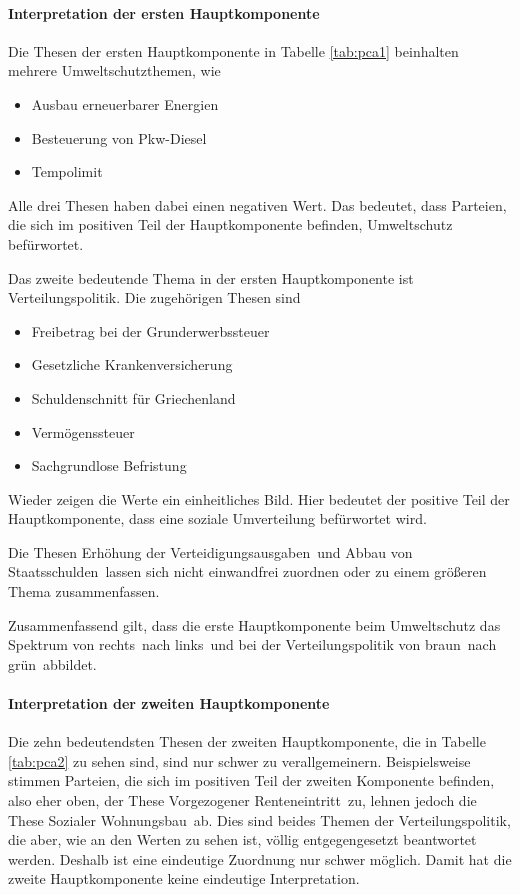 \paragraph{Interpretation der ersten Hauptkomponente}
Die Thesen der ersten Hauptkomponente in Tabelle \ref{tab:pca1} beinhalten mehrere Umweltschutzthemen, wie
\begin{itemize}
	\item Ausbau erneuerbarer Energien
	\item Besteuerung von Pkw-Diesel
	\item Tempolimit
\end{itemize}
Alle drei Thesen haben dabei einen negativen Wert. Das bedeutet, dass Parteien, die sich im positiven Teil der Hauptkomponente befinden, Umweltschutz befürwortet.

Das zweite bedeutende Thema in der ersten Hauptkomponente ist Verteilungspolitik. Die zugehörigen Thesen sind
\begin{itemize}
	\item Freibetrag bei der Grunderwerbssteuer
	\item Gesetzliche Krankenversicherung
	\item Schuldenschnitt für Griechenland
	\item Vermögenssteuer
	\item Sachgrundlose Befristung
\end{itemize}
Wieder zeigen die Werte ein einheitliches Bild. Hier bedeutet der positive Teil der Hauptkomponente, dass eine soziale Umverteilung befürwortet wird.

Die Thesen \glqq Erhöhung der Verteidigungsausgaben\grqq\ und \glqq Abbau von Staatsschulden\grqq\ lassen sich nicht einwandfrei zuordnen oder zu einem größeren Thema zusammenfassen.

Zusammenfassend gilt, dass die erste Hauptkomponente beim Umweltschutz das Spektrum von \glqq rechts\grqq\ nach \glqq links\grqq\ und bei der Verteilungspolitik von \glqq braun\grqq\ nach \glqq grün\grqq\ abbildet.

\paragraph{Interpretation der zweiten Hauptkomponente}
Die zehn bedeutendsten Thesen der zweiten Hauptkomponente, die in Tabelle \ref{tab:pca2} zu sehen sind, sind nur schwer zu verallgemeinern. Beispielsweise stimmen Parteien, die sich im positiven Teil der zweiten Komponente befinden, also eher oben, der These \glqq Vorgezogener Renteneintritt\grqq\ zu, lehnen jedoch die These \glqq Sozialer Wohnungsbau\grqq\ ab. Dies sind beides Themen der Verteilungspolitik, die aber, wie an den Werten zu sehen ist, völlig entgegengesetzt beantwortet werden. Deshalb ist eine eindeutige Zuordnung nur schwer möglich.
Damit hat die zweite Hauptkomponente keine eindeutige Interpretation.

